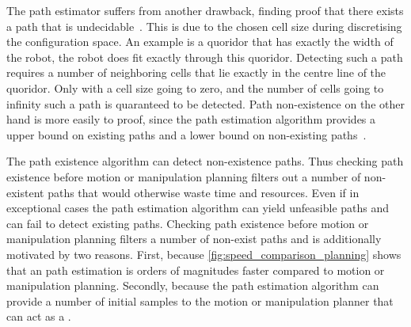 The path estimator suffers from another drawback, finding proof that there exists a path that is undecidable~\cite{zhang_simple_2008}. This is due to the chosen cell size during discretising the configuration space. An example is a quoridor that has exactly the width of the robot, the robot does fit exactly through this quoridor. Detecting such a path requires a number of neighboring cells that lie exactly in the centre line of the quoridor. Only with a cell size going to zero, and the number of cells going to infinity such a path is quaranteed to be detected. Path non-existence on the other hand is more easily to proof, since the path estimation algorithm provides a upper bound on existing paths and a lower bound on non-existing paths~\cite{zhang_simple_2008}.\bs

The path existence algorithm can detect non-existence paths. Thus checking path existence before motion or manipulation planning filters out a number of non-existent paths that would otherwise waste time and resources. Even if in exceptional cases the path estimation algorithm can yield unfeasible paths and can fail to detect existing paths. Checking path existence before motion or manipulation planning filters a number of non-exist paths and is additionally motivated by two reasons. First, because \cref{fig:speed_comparison_planning} shows that an path estimation is orders of magnitudes faster compared to motion or manipulation planning. Secondly, because the path estimation algorithm can provide a number of initial samples to the motion or manipulation planner that can act as a .


